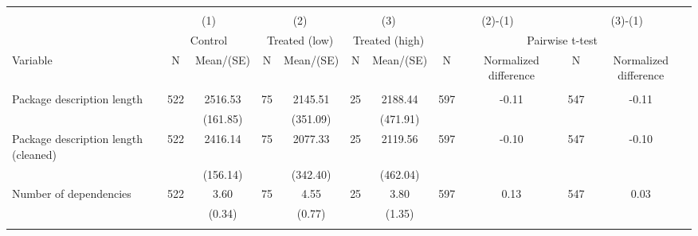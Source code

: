 
\begin{tabular}{@{\extracolsep{5pt}}lcccccccccc}
\\[-1.8ex]\hline \hline \\[-1.8ex]
 & \multicolumn{2}{c}{(1)}  & \multicolumn{2}{c}{(2)}  & \multicolumn{2}{c}{(3)}  & \multicolumn{2}{c}{(2)-(1)} & \multicolumn{2}{c}{(3)-(1)} \\
 & \multicolumn{2}{c}{Control}  & \multicolumn{2}{c}{Treated (low)}  & \multicolumn{2}{c}{Treated (high)}  & \multicolumn{4}{c}{Pairwise t-test}  \\
Variable & N & Mean/(SE) & N & Mean/(SE) & N & Mean/(SE) & N & Normalized difference & N & Normalized difference \\ \hline \\[-1.8ex] 
Package description length   & 522    & 2516.53    & 75    & 2145.51    & 25    & 2188.44    & 597    & -0.11    & 547    & -0.11   \\
 &   & (161.85)  &   & (351.09)  &   & (471.91)  &   &  &   &  \\ [1ex]
Package description length (cleaned)   & 522    & 2416.14    & 75    & 2077.33    & 25    & 2119.56    & 597    & -0.10    & 547    & -0.10   \\
 &   & (156.14)  &   & (342.40)  &   & (462.04)  &   &  &   &  \\ [1ex]
Number of dependencies   & 522    & 3.60    & 75    & 4.55    & 25    & 3.80    & 597    & 0.13    & 547    & 0.03   \\
 &   & (0.34)  &   & (0.77)  &   & (1.35)  &   &  &   &  \\ [1ex]
\hline \hline \\[-1.8ex]

\end{tabular}
